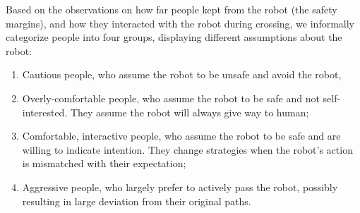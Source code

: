 \documentclass[conference]{IEEEtran}
\begin{document}
Based on the observations on 
how far people kept from the robot (the safety margins), and how they interacted with the robot during crossing, we informally categorize people into four groups, 
displaying different assumptions about the robot:
\begin{enumerate}
  \item Cautious people, who assume the robot to be unsafe and avoid the robot,
  \item Overly-comfortable people, who assume the robot to be safe and 
    not self-interested. They assume the robot will always give way to human;
  \item Comfortable, interactive people, who assume the robot to be safe and 
    are willing to indicate intention. They change strategies when the robot's 
    action is mismatched with their expectation;
  \item Aggressive people, who largely prefer to actively pass the robot, possibly 
    resulting in large deviation from their original paths.   
\end{enumerate}

\end{document}
